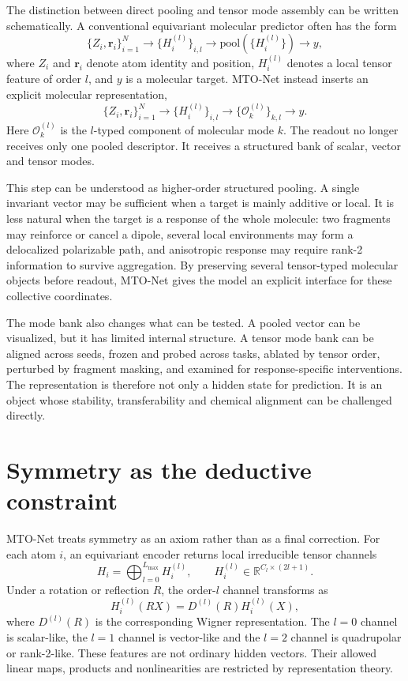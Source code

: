 \documentclass[11pt]{article}
\newcommand{\R}{\mathbb{R}}
\newcommand{\mto}{\mathcal{O}}
\begin{document}
The distinction between direct pooling and tensor mode assembly can be written schematically. A conventional equivariant molecular predictor often has the form
\begin{equation}
\{Z_i,\bm r_i\}_{i=1}^{N}
\rightarrow \{H_i^{(l)}\}_{i,l}
\rightarrow \mathrm{pool}(\{H_i^{(l)}\})
\rightarrow y ,
\end{equation}
where $Z_i$ and $\bm r_i$ denote atom identity and position, $H_i^{(l)}$ denotes a local tensor feature of order $l$, and $y$ is a molecular target. MTO-Net instead inserts an explicit molecular representation,
\begin{equation}
\{Z_i,\bm r_i\}_{i=1}^{N}
\rightarrow \{H_i^{(l)}\}_{i,l}
\rightarrow \{\mto_k^{(l)}\}_{k,l}
\rightarrow y .
\end{equation}
Here $\mto_k^{(l)}$ is the $l$-typed component of molecular mode $k$. The readout no longer receives only one pooled descriptor. It receives a structured bank of scalar, vector and tensor modes.

This step can be understood as higher-order structured pooling. A single invariant vector may be sufficient when a target is mainly additive or local. It is less natural when the target is a response of the whole molecule: two fragments may reinforce or cancel a dipole, several local environments may form a delocalized polarizable path, and anisotropic response may require rank-2 information to survive aggregation. By preserving several tensor-typed molecular objects before readout, MTO-Net gives the model an explicit interface for these collective coordinates.

The mode bank also changes what can be tested. A pooled vector can be visualized, but it has limited internal structure. A tensor mode bank can be aligned across seeds, frozen and probed across tasks, ablated by tensor order, perturbed by fragment masking, and examined for response-specific interventions. The representation is therefore not only a hidden state for prediction. It is an object whose stability, transferability and chemical alignment can be challenged directly.

\section*{Symmetry as the deductive constraint}

MTO-Net treats symmetry as an axiom rather than as a final correction. For each atom $i$, an equivariant encoder returns local irreducible tensor channels
\begin{equation}
H_i=\bigoplus_{l=0}^{L_{\max}} H_i^{(l)}, \qquad
H_i^{(l)}\in \R^{C_l\times(2l+1)} .
\end{equation}
Under a rotation or reflection $R$, the order-$l$ channel transforms as
\begin{equation}
H_i^{(l)}(RX)=D^{(l)}(R)H_i^{(l)}(X),
\end{equation}
where $D^{(l)}(R)$ is the corresponding Wigner representation. The $l=0$ channel is scalar-like, the $l=1$ channel is vector-like and the $l=2$ channel is quadrupolar or rank-2-like. These features are not ordinary hidden vectors. Their allowed linear maps, products and nonlinearities are restricted by representation theory.
\end{document}

